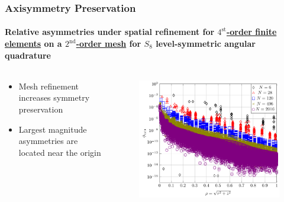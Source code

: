 \documentclass[compress,t]{beamer}
\begin{document}
\begin{frame}[t]
\frametitle{Axisymmetry Preservation}
\framesubtitle{Relative asymmetries under spatial refinement for \underline{$4^\text{st}$-order finite elements} on a \underline{$2^\text{nd}$-order mesh} for $S_8$ level-symmetric angular quadrature}

\begin{columns}[T]

\begin{column}{0.4\textwidth}
\begin{itemize}
\item{Mesh refinement increases symmetry preservation}
\item{Largest magnitude asymmetries are located near the origin}
\end{itemize}

\end{column}

\begin{column}{0.6\textwidth}
\begin{figure}
\flushright
\includegraphics[scale=0.6]{./graphics/RZASMMSLinearRhoBrunnerp4S8g2.pdf}
\end{figure}

\end{column}

\end{columns}

\end{frame}

\subsection{}
\end{document}
